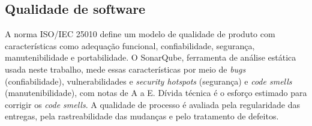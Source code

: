 \subsection{Qualidade de software}

A norma ISO/IEC 25010 \cite{iso25010} define um modelo de qualidade de produto com características como adequação funcional, confiabilidade, segurança, manutenibilidade e portabilidade. O SonarQube, ferramenta de análise estática usada neste trabalho, mede essas características por meio de \textit{bugs} (confiabilidade), vulnerabilidades e \textit{security hotspots} (segurança) e \textit{code smells} (manutenibilidade), com notas de A a E. Dívida técnica é o esforço estimado para corrigir os \textit{code smells}. A qualidade de processo é avaliada pela regularidade das entregas, pela rastreabilidade das mudanças e pelo tratamento de defeitos.
